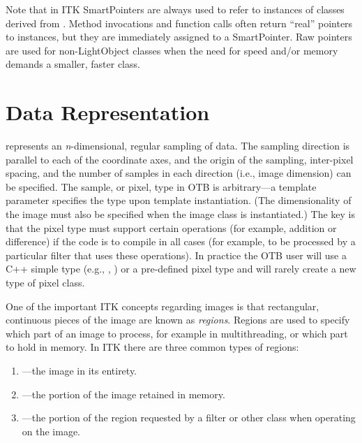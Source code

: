Note that in ITK SmartPointers are always used to refer to instances of
classes derived from . Method invocations and function
calls often return ``real'' pointers to instances, but they are immediately
assigned to a SmartPointer. Raw pointers are used for non-LightObject classes when
the need for speed and/or memory demands a smaller, faster class.


\section{Data Representation}
\label{sec:DataRepresentationAndAccess}



 represents an \emph{n}-dimensional, regular sampling of
data. The sampling direction is parallel to each of the coordinate axes, and
the origin of the sampling, inter-pixel spacing, and the number of samples in
each direction (i.e., image dimension) can be specified. The sample, or
pixel, type in OTB is arbitrary---a template parameter 
specifies the type upon template instantiation. (The dimensionality of the
image must also be specified when the image class is instantiated.) The key
is that the pixel type must support certain operations (for example, addition
or difference) if the code is to compile in all cases (for example, to be
processed by a particular filter that uses these operations). In practice the
OTB user will use a C++ simple type (e.g., , ) or a pre-defined pixel
type and will rarely create a new type of pixel class.

One of the important ITK concepts regarding images is that rectangular,
continuous pieces of the image are known as \emph{regions}. Regions are used
to specify which part of an image to process, for example in multithreading,
or which part to hold in memory. In ITK there are three common types of
regions:
\begin{enumerate}
\item {}---the image in its entirety.
\item {}---the portion of the image retained in memory.
\item {}---the portion of the region requested by a 
filter or other class when operating on the image.
\end{enumerate}

